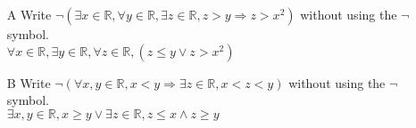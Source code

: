 \documentclass[12pt]{article}
\begin{document}
\begin{enumerate}
	\item [A] Write $\neg(\exists x \in \mathbb{R}, \forall y \in \mathbb{R}, \exists z \in \mathbb{R}, z > y \Rightarrow z > x^2)$ without using the $\neg$ symbol.\\
	    $\forall x \in \mathbb{R}, \exists y \in \mathbb{R}, \forall z \in \mathbb{R}, (z \le y \lor z > x^2)$
	\item [B] Write $\neg(\forall x,y \in \mathbb{R}, x < y \Rightarrow \exists z \in \mathbb{R}, x < z < y)$ without using the $\neg$ symbol.\\
	    $\exists x,y \in \mathbb{R}, x \ge y \lor \exists z \in \mathbb{R}, z \le x \land z \ge y$
\end{enumerate}
\end{document}
